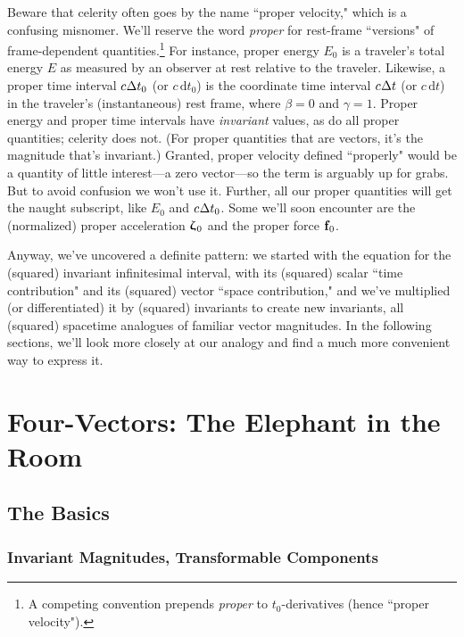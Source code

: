 \documentclass[12pt]{article}
\renewcommand{\vv}[1]{\mathbf{#1}}
\newcommand{\dd}[1]{\mathrm{d}#1}
\newcommand{\vvzeta}{\bm{\upzeta}}
\begin{document}
Beware that celerity often goes by the name ``proper velocity," which is a confusing misnomer. We'll reserve the word \emph{proper} for rest-frame ``versions" of frame-dependent quantities.\footnote{\label{fn:pr}A competing convention prepends \emph{proper} to $t_0$-derivatives (hence ``proper velocity").} For instance, proper energy $E_0$ is a traveler's total energy $E$ as measured by an observer at rest relative to the traveler. Likewise, a proper time interval $c \mkern.5mu \Delta t_0$ (or $c \, \dd t_0$) is the coordinate time interval $c \mkern.5mu \Delta t$ (or $c \, \dd t$) in the traveler's (instantaneous) rest frame, where $\beta = 0$ and $\gamma = 1$. Proper energy and proper time intervals have \emph{invariant} values, as do all proper quantities; celerity does not. (For proper quantities that are vectors, it's the magnitude that's invariant.) Granted, proper velocity defined ``properly" would be a quantity of little interest---a zero vector---so the term is arguably up for grabs. But to avoid confusion we won't use it. Further, all our proper quantities will get the naught subscript, like $E_0$ and $c \mkern.5mu \Delta t_0$. Some we'll soon encounter are the (normalized) proper acceleration $\vvzeta_{\mkern1mu 0}$ and the proper force $\vv f_{\mkern1mu 0}$.

Anyway, we've uncovered a definite pattern: we started with the equation for the (squared) invariant infinitesimal interval, with its (squared) scalar ``time contribution" and its (squared) vector ``space contribution," and we've multiplied (or differentiated) it by (squared) invariants to create new invariants, all (squared) spacetime analogues of familiar vector magnitudes. In the following sections, we'll look more closely at our analogy and find a much more convenient way to express it.


\clearpage

\section{Four-Vectors: The Elephant in the Room}

\subsection{The Basics}

\subsubsection{Invariant Magnitudes, Transformable Components}
\end{document}

